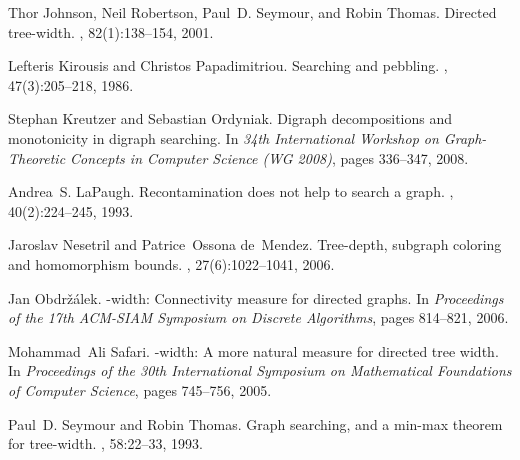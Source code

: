 \documentclass{llncs}
\begin{document}
\begin{thebibliography}{10}
Thor Johnson, Neil Robertson, Paul~D. Seymour, and Robin Thomas.
\newblock Directed tree-width.
, 82(1):138--154,
  2001.

Lefteris Kirousis and Christos Papadimitriou.
\newblock Searching and pebbling.
, 47(3):205--218, 1986.

Stephan Kreutzer and Sebastian Ordyniak.
\newblock Digraph decompositions and monotonicity in digraph searching.
\newblock In {\em 34th International Workshop on Graph-Theoretic Concepts in
  Computer Science (WG 2008)}, pages 336--347, 2008.

Andrea~S. LaPaugh.
\newblock Recontamination does not help to search a graph.
, 40(2):224--245, 1993.

Jaroslav Nesetril and Patrice~Ossona de~Mendez.
\newblock Tree-depth, subgraph coloring and homomorphism bounds.
, 27(6):1022--1041, 2006.

Jan Obdr\v{z}\'{a}lek.
-width: {C}onnectivity measure for directed graphs.
\newblock In {\em Proceedings of the 17th ACM-SIAM Symposium on Discrete
  Algorithms}, pages 814--821, 2006.

Mohammad~Ali Safari.
-width: A more natural measure for directed tree width.
\newblock In {\em Proceedings of the 30th International Symposium on
  Mathematical Foundations of Computer Science}, pages 745--756, 2005.

Paul~D. Seymour and Robin Thomas.
\newblock Graph searching, and a min-max theorem for tree-width.
, 58:22--33, 1993.

\end{thebibliography}
\end{document}
